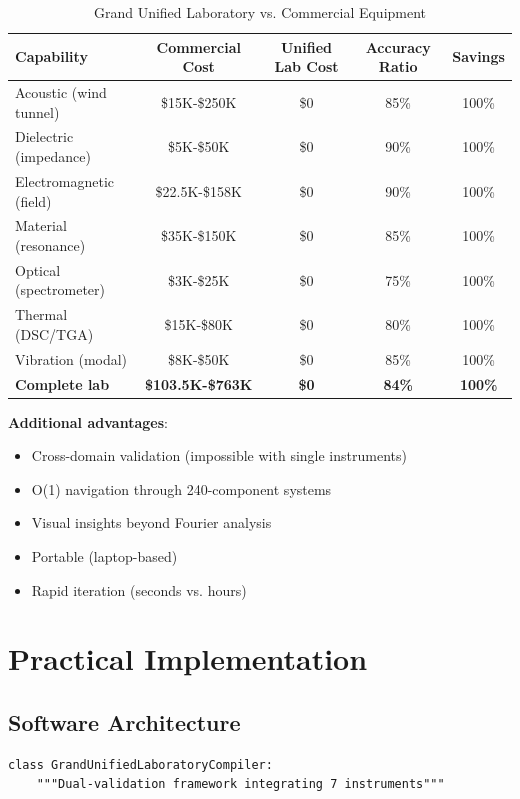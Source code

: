 \documentclass[12pt,a4paper]{article}
\begin{document}
{{{{{{{{{{{{{{{{\begin{table}[H]
\centering
\caption{Grand Unified Laboratory vs. Commercial Equipment}
\begin{tabular}{lcccc}
\toprule
\textbf{Capability} & \textbf{Commercial Cost} & \textbf{Unified Lab Cost} & \textbf{Accuracy Ratio} & \textbf{Savings} \\
\midrule
Acoustic (wind tunnel) & \$15K-\$250K & \$0 & 85\% & 100\% \\
Dielectric (impedance) & \$5K-\$50K & \$0 & 90\% & 100\% \\
Electromagnetic (field) & \$22.5K-\$158K & \$0 & 90\% & 100\% \\
Material (resonance) & \$35K-\$150K & \$0 & 85\% & 100\% \\
Optical (spectrometer) & \$3K-\$25K & \$0 & 75\% & 100\% \\
Thermal (DSC/TGA) & \$15K-\$80K & \$0 & 80\% & 100\% \\
Vibration (modal) & \$8K-\$50K & \$0 & 85\% & 100\% \\
\midrule
\textbf{Complete lab} & \textbf{\$103.5K-\$763K} & \textbf{\$0} & \textbf{84\%} & \textbf{100\%} \\
\bottomrule
\end{tabular}
\end{table}

\textbf{Additional advantages}:
\begin{itemize}
\item Cross-domain validation (impossible with single instruments)
\item O(1) navigation through 240-component systems
\item Visual insights beyond Fourier analysis
\item Portable (laptop-based)
\item Rapid iteration (seconds vs. hours)
\end{itemize}

\section{Practical Implementation}

\subsection{Software Architecture}

\begin{lstlisting}[style=pythonstyle, caption=Grand Unified Laboratory Compiler Core]
class GrandUnifiedLaboratoryCompiler:
    """Dual-validation framework integrating 7 instruments"""
    

\end{lstlisting}}}}}}}}}}}}}}}}}
\end{document}
